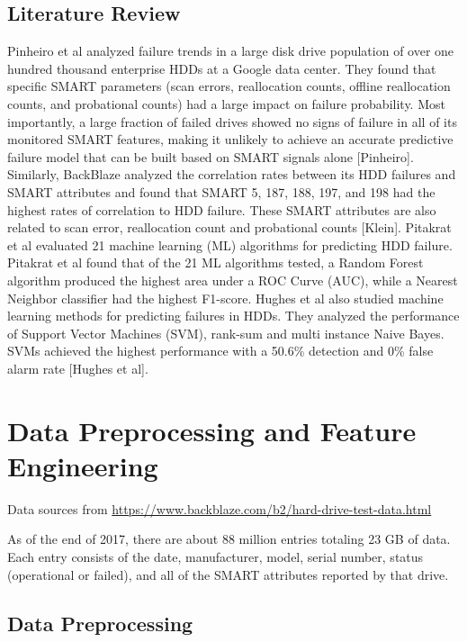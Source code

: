\documentclass[12pt,a4paper,english]{amsart}
\begin{document}
\subsection{Literature Review}

Pinheiro et al analyzed failure trends in a large disk drive population of over one hundred thousand enterprise HDDs at a Google data center. They found that specific SMART parameters (scan errors, reallocation counts, offline reallocation counts, and probational counts) had a large impact on failure probability. Most importantly, a large fraction of failed drives showed no signs of failure in all of its monitored SMART features, making it unlikely to achieve an accurate predictive failure model that can be built based on SMART signals alone [Pinheiro]. Similarly, BackBlaze analyzed the correlation rates between its HDD failures and SMART attributes and found that SMART 5, 187, 188, 197, and 198 had the highest rates of correlation to HDD failure. These SMART attributes are also related   to   scan   error,   reallocation   count   and   probational   counts   [Klein].
Pitakrat et al evaluated 21 machine learning (ML) algorithms for predicting HDD failure. Pitakrat et al found that of the 21 ML algorithms tested, a Random Forest algorithm produced the highest area under a ROC Curve (AUC), while   a   Nearest   Neighbor   classifier   had   the   highest   F1-score.
Hughes et al also studied machine learning methods for predicting failures in HDDs. They analyzed the performance of Support Vector Machines (SVM), rank-sum and multi instance Naive Bayes. SVMs achieved the highest   performance   with   a   50.6\%   detection   and   0\%   false   alarm   rate   [Hughes   et   al].

%
\section{Data Preprocessing and Feature Engineering}

Data sources from \url{https://www.backblaze.com/b2/hard-drive-test-data.html}

As of the end of 2017, there are about 88 million entries totaling 23 GB of data. Each entry consists of the date, manufacturer, model, serial number, status (operational or failed), and all of the SMART attributes reported by that drive. 

\subsection{Data Preprocessing}
\end{document}

